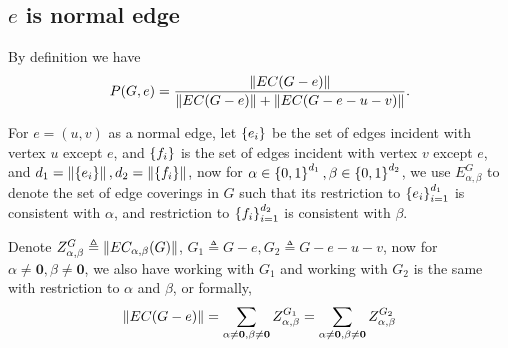 %
%


\subsection{$e$ is normal edge}

By definition we have
\begin{equation}
	P(G,e) = \frac{\left\Vert EC(G-e)\right\Vert}{\left\Vert EC(G-e)\right\Vert + \left\Vert EC(G-e-u-v)\right\Vert }.
\end{equation}


	For $e=(u,v)$ as a normal edge, let $\left\{e_i\right\}$ be the set of edges incident with vertex $u$ except $e$, and $\left\{f_i\right\}$ is the set of edges incident with vertex $v$ except $e$, and $d_1 = \left\Vert\left\{e_i\right\}\right\Vert, d_2 = \left\Vert\left\{f_i\right\}\right\Vert$, now for $\alpha \in \left\{0,1\right\}^{d_1}, \beta \in \left\{0,1\right\}^{d_2}$, we use $E_{\alpha,\beta}^G$ to denote the set of edge coverings in $G$ such that its restriction to $\left\{e_i\right\}_{i=1}^{d_1}$ is consistent with $\alpha$, and restriction to $\left\{f_i\right\}_{i=1}^{d_2}$ is consistent with $\beta$.

	Denote $Z_{\alpha, \beta}^G \triangleq \left\Vert EC_{\alpha, \beta}(G)\right\Vert$, $G_1 \triangleq G-e, G_2 \triangleq G-e-u-v$, %
	now for $\alpha \neq \mathbf{0} , \beta \neq \mathbf{0}$, we also have working with $G_1$ and working with $G_2$ is the same with restriction to $\alpha$ and $\beta$, or formally,
\[\left\Vert EC(G-e)\right\Vert = \sum_{\alpha \neq \mathbf{0}, \beta \neq \mathbf{0}} Z_{\alpha, \beta}^{G_1} = \sum_{\alpha \neq \mathbf{0}, \beta \neq \mathbf{0}} Z_{\alpha, \beta}^{G_2}\]

